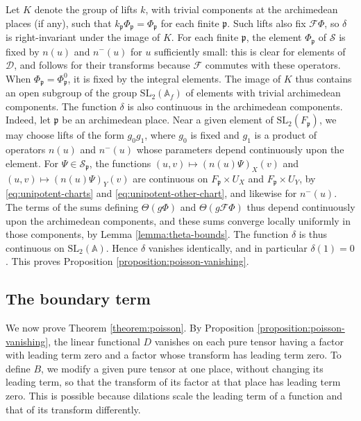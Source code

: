 \documentclass[reqno]{amsart}
\theoremstyle{plain}
\theoremstyle{definition}
\theoremstyle{itplain}
\numberwithin{equation}{section}
\numberwithin{theorem}{section}
\begin{document}
Let $K$ denote the group of lifts $k$, with trivial components at the archimedean places (if any), such that $k_{\mathfrak{p}} \Phi_{\mathfrak{p}} = \Phi_{\mathfrak{p}}$ for each finite $\mathfrak{p}$.  Such lifts also fix $\mathcal{F} \Phi$, so $\delta$ is right-invariant under the image of $K$.  For each finite $\mathfrak{p}$, the element $\Phi_{\mathfrak{p}}$ of $\mathcal{S}$ is fixed by $n(u)$ and $n^-(u)$ for $u$ sufficiently small: this is clear for elements of $\mathcal{D}$, and follows for their transforms because $\mathcal{F}$ commutes with these operators.  When $\Phi_{\mathfrak{p}} = \Phi_{\mathfrak{p}}^0$, it is fixed by the integral elements.  The image of $K$ thus contains an open subgroup of the group $\mathrm{SL}_2(\mathbb{A}_f)$ of elements with trivial archimedean components.  The function $\delta$ is also continuous in the archimedean components.  Indeed, let $\mathfrak{p}$ be an archimedean place.  Near a given element of $\mathrm{SL}_2(F_{\mathfrak{p}})$, we may choose lifts of the form $g_0 g_1$, where $g_0$ is fixed and $g_1$ is a product of operators $n(u)$ and $n^-(u)$ whose parameters depend continuously upon the element.  For $\Psi \in \mathcal{S}_{\mathfrak{p}}$, the functions $(u, v) \mapsto (n(u) \Psi)_X(v)$ and $(u, v) \mapsto (n(u) \Psi)_Y(v)$ are continuous on $F_{\mathfrak{p}} \times U_X$ and $F_{\mathfrak{p}} \times U_Y$, by \eqref{eq:unipotent-charts} and \eqref{eq:unipotent-other-chart}, and likewise for $n^-(u)$.  The terms of the sums defining $\Theta(g \Phi)$ and $\Theta(g \mathcal{F} \Phi)$ thus depend continuously upon the archimedean components, and these sums converge locally uniformly in those components, by Lemma \ref{lemma:theta-bounds}.  The function $\delta$ is thus continuous on $\mathrm{SL}_2(\mathbb{A})$.
Hence $\delta$ vanishes identically, and in particular $\delta(1) = 0$.  This proves Proposition \ref{proposition:poisson-vanishing}.

\subsection{The boundary term}\label{sec:boundary}
We now prove Theorem \ref{theorem:poisson}.  By Proposition \ref{proposition:poisson-vanishing}, the linear functional $D$ vanishes on each pure tensor having a factor with leading term zero and a factor whose transform has leading term zero.  To define $B$, we modify a given pure tensor at one place, without changing its leading term, so that the transform of its factor at that place has leading term zero.  This is possible because dilations scale the leading term of a function and that of its transform differently.
\end{document}
